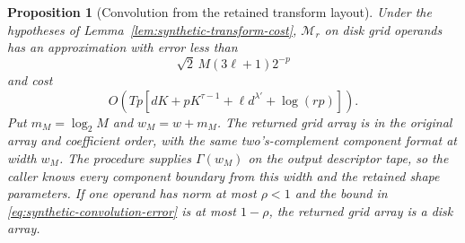 \documentclass[11pt]{article}
\newtheorem{proposition}[theorem]{Proposition}
\theoremstyle{definition}
\begin{document}
\begin{proposition}[Convolution from the retained transform layout]
\label{prop:synthetic-convolution}
Under the hypotheses of Lemma~\ref{lem:synthetic-transform-cost},
$\mathcal M_r$ on disk grid operands has an approximation with error
less than
\begin{equation}
       \sqrt2\,M(3\ell+1)2^{-p}
 \label{eq:synthetic-convolution-error}
\end{equation}
and cost
\[
O\left(Tp\left[dK+pK^{\tau-1}+\ell d^{\lambda'}
                    +\log(rp)\right]\right).
\]
Put $m_M=\log_2M$ and $w_M=w+m_M$. The returned grid array is in the
original array and coefficient order, with the same two's-complement
component format at width $w_M$. The procedure supplies
$\Gamma(w_M)$ on the output descriptor tape, so the caller knows every
component boundary from this width and the retained shape parameters.
If one operand has norm at most $\rho<1$ and the bound in
\eqref{eq:synthetic-convolution-error} is at most $1-\rho$, the
returned grid array is a disk array.
\end{proposition}
\end{document}
